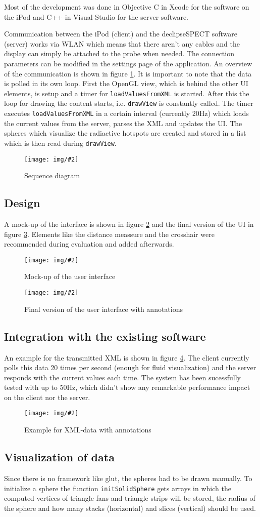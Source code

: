 \documentclass{scrartcl}
\newcommand{\graphic}[3][width=\linewidth] %
{
  \begin{figure}[h!t]
    \centering
    \texttt{[image: img/\#2]}
    \caption{#3}
    \label{fig:#2}
  \end{figure}
}
\newcommand{\refFigure}[1]{figure \ref{fig:#1}}
\begin{document}
Most of the development was done in Objective C in Xcode for the software on the iPod and C++ in Visual Studio for the server software.

Communication between the iPod (client) and the declipseSPECT software (server) works via WLAN which means that there aren't any cables and the display can simply be attached to the probe when needed. The connection parameters can be modified in the settings page of the application.
An overview of the communication is shown in \refFigure{sequence-diagram}. It is important to note that the data is polled in its own loop. First the OpenGL view, which is behind the other UI elements, is setup and a timer for \verb|loadValuesFromXML| is started. After this the loop for drawing the content starts, i.e. \verb|drawView| is constantly called. The timer executes \verb|loadValuesFromXML| in a certain interval (currently 20Hz) which loads the current values from the server, parses the XML and updates the UI. The spheres which visualize the radiactive hotspots are created and stored in a list which is then read during \verb|drawView|.
\graphic[scale=.8]{sequence-diagram}{Sequence diagram}


\subsection{Design}
A mock-up of the interface is shown in \refFigure{mockup} and the final version of the UI in \refFigure{screen-annotated}. Elements like the distance meassure and the crosshair were recommended during evaluation and added afterwards.
\graphic[scale=.5]{mockup}{Mock-up of the user interface}
\graphic[scale=.5]{screen-annotated}{Final version of the user interface with annotations}


\subsection{Integration with the existing software}
An example for the transmitted XML is shown in \refFigure{data}. The client currently polls this data 20 times per second (enough for fluid visualization) and the server responds with the current values each time. The system has been sucessfully tested with up to 50Hz, which didn't show any remarkable performance impact on the client nor the server.
\graphic[scale=.5]{data}{Example for XML-data with annotations}

\subsection{Visualization of data}
Since there is no framework like glut, the spheres had to be drawn manually. To initialize a sphere the function \verb|initSolidSphere| gets arrays in which the computed vertices of triangle fans and triangle strips will be stored, the radius of the sphere and how many stacks (horizontal) and slices (vertical) should be used.
\end{document}
